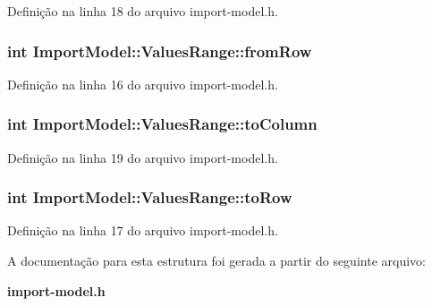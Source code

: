 Definição na linha 18 do arquivo import-\/model.\+h.

\subsubsection[{from\+Row}]{\setlength{\rightskip}{0pt plus 5cm}int Import\+Model\+::\+Values\+Range\+::from\+Row}\label{struct_import_model_1_1_values_range_ad0dfa6f07d7eaf2a55cc8a7e39ea8173}


Definição na linha 16 do arquivo import-\/model.\+h.

\subsubsection[{to\+Column}]{\setlength{\rightskip}{0pt plus 5cm}int Import\+Model\+::\+Values\+Range\+::to\+Column}\label{struct_import_model_1_1_values_range_a7a4d3b814849e212e9204f1f5122235e}


Definição na linha 19 do arquivo import-\/model.\+h.

\subsubsection[{to\+Row}]{\setlength{\rightskip}{0pt plus 5cm}int Import\+Model\+::\+Values\+Range\+::to\+Row}\label{struct_import_model_1_1_values_range_a42ff946cff951ea853ddfb8c67e2b9fa}


Definição na linha 17 do arquivo import-\/model.\+h.



A documentação para esta estrutura foi gerada a partir do seguinte arquivo\+:\begin{DoxyCompactItemize}
\item 
{\bf import-\/model.\+h}\end{DoxyCompactItemize}
